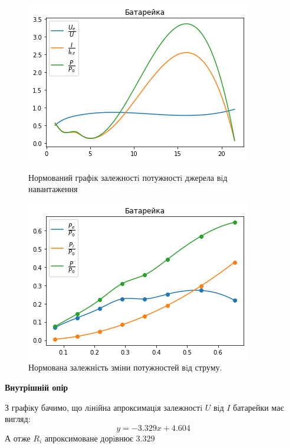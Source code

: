 \documentclass[a4paper,12pt]{article}
\newcommand{\ri}{R_i}
\begin{document}
	\begin{figure}[h!]
		\begin{minipage}[h]{0.5\linewidth}
			\includegraphics[width=1\linewidth]{Prt sc/Figure_1_3.jpeg}
			\caption{Нормований графiк залежностi потужностi джерела вiд навантаження}
		\end{minipage}
		\begin{minipage}[h]{0.5\linewidth}
			\includegraphics[width=1\linewidth]{Prt sc/Figure_1_4.jpeg}
			\caption{Нормована залежність змiни потужностей вiд струму.}
		\end{minipage}
	\end{figure}
	
	\begin{flushleft}
		\textbf{Внутрішній опір}
	\end{flushleft}
	З графiку бачимо, що лiнiйна апроксимацiя залежностi $U$ вiд $I$ батарейки має вигляд:\\ $$y=-3.329x+4.604$$
	А отже $\ri$ апроксимоване дорiвнює $3.329$
	
\end{document}
